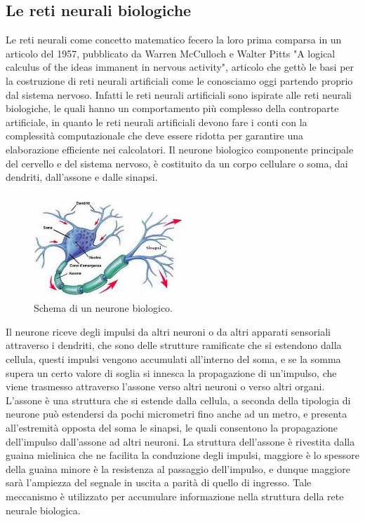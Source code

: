 \subsection{Le reti neurali biologiche}

Le reti neurali come concetto matematico fecero la loro prima comparsa in un articolo del 1957, pubblicato da Warren McCulloch e Walter Pitts
"A logical calculus of the ideas immanent in nervous activity", articolo che gettò le basi per la costruzione di reti neurali artificiali
come le conosciamo oggi partendo proprio dal sistema nervoso.
Infatti le reti neurali artificiali sono ispirate alle reti neurali biologiche, le quali hanno un comportamento più complesso della
controparte artificiale, in quanto le reti neurali artificiali devono fare i conti con la complessità computazionale che deve essere 
ridotta per garantire una elaborazione efficiente nei calcolatori.
Il neurone biologico componente principale del cervello e del sistema nervoso, è costituito da un corpo cellulare o soma, dai dendriti, 
dall'assone e dalle sinapsi.
    \begin{figure}[H]
        \centering
        \includegraphics[width=0.5\textwidth]{imgs/neurone.jpg}
        \caption{Schema di un neurone biologico.}
        \label{fig:neuron_bio}
    \end{figure}
Il neurone riceve degli impulsi da altri neuroni o da altri apparati sensoriali attraverso i dendriti, che sono delle strutture ramificate
che si estendono dalla cellula, questi impulsi vengono accumulati all'interno del soma, e se la somma supera un certo valore di soglia
si innesca la propagazione di un'impulso, che viene trasmesso attraverso l'assone verso altri neuroni o verso altri organi.
L'assone è una struttura che si estende dalla cellula, a seconda della tipologia di neurone può estendersi da pochi micrometri fino anche ad un metro,
e presenta all'estremità opposta del soma le sinapsi, le quali consentono la propagazione dell'impulso dall'assone ad altri neuroni.
La struttura dell'assone è rivestita dalla guaina mielinica che ne facilita la conduzione degli impulsi, maggiore è lo spessore della guaina
minore è la resistenza al passaggio dell'impulso, e dunque maggiore sarà l'ampiezza del segnale in uscita a parità di quello di ingresso. 
Tale meccanismo è utilizzato per accumulare informazione nella struttura della rete neurale biologica.

